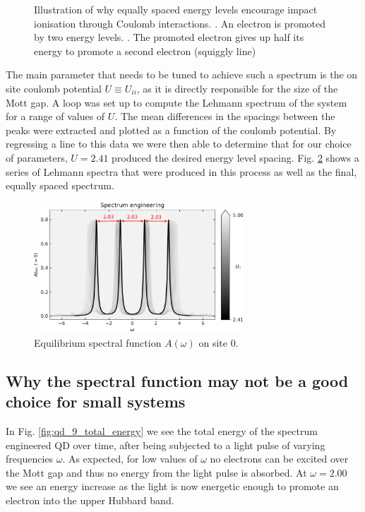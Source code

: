 \begin{figure}[!hbt]
    \captionsetup{singlelinecheck=off}
    \caption{Illustration of why equally spaced energy levels encourage impact ionisation through Coulomb interactions.
    . An electron is promoted by two energy levels. 
    . The promoted electron gives up half its energy to promote a second electron (squiggly line)}
    \label{fig:qd_spectrum_delta}
\end{figure}

The main parameter that needs to be tuned to achieve such a spectrum is the on site coulomb potential $U \equiv U_{ii}$, as it is directly responsible for the size of the Mott gap. A loop was set up to compute the Lehmann spectrum of the system for a range of values of $U$. The mean differences in the spacings between the peaks were extracted and plotted as a function of the coulomb potential. By regressing a line to this data we were then able to determine that for our choice of parameters, $U = 2.41$ produced the desired energy level spacing. Fig. \ref{fig:spectrum_engineering} shows a series of Lehmann spectra that were produced in this process as well as the final, equally spaced spectrum.


\begin{figure}[!hbt]
    \centering
    \includegraphics[width=0.7\textwidth]{graph/spectrum_engineering.pdf}
    \caption{Equilibrium spectral function $A(\omega)$ on site 0.}
    \label{fig:spectrum_engineering}
\end{figure}

\subsection{Why the spectral function may not be a good choice for small systems}
In Fig. \ref{fig:qd_9_total_energy} we see the total energy of the spectrum engineered QD over time, after being subjected to a light pulse of varying frequencies $\omega$. As expected, for low values of $\omega$ no electrons can be excited over the Mott gap and thus no energy from the light pulse is absorbed. At $\omega = 2.00$ we see an energy increase as the light is now energetic enough to promote an electron into the upper Hubbard band.

